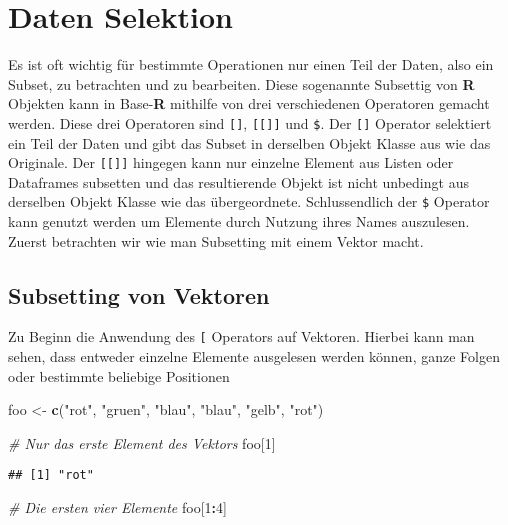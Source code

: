 \documentclass[
]{book}
\newenvironment{Shaded}{\begin{snugshade}}{\end{snugshade}}
\newcommand{\CommentTok}[1]{\textcolor[rgb]{0.56,0.35,0.01}{\textit{#1}}}
\newcommand{\DecValTok}[1]{\textcolor[rgb]{0.00,0.00,0.81}{#1}}
\newcommand{\KeywordTok}[1]{\textcolor[rgb]{0.13,0.29,0.53}{\textbf{#1}}}
\newcommand{\NormalTok}[1]{#1}
\newcommand{\OperatorTok}[1]{\textcolor[rgb]{0.81,0.36,0.00}{\textbf{#1}}}
\newcommand{\StringTok}[1]{\textcolor[rgb]{0.31,0.60,0.02}{#1}}
\begin{document}
\hypertarget{daten-selektion}{%
\section{Daten Selektion}\label{daten-selektion}}

Es ist oft wichtig für bestimmte Operationen nur einen Teil der Daten, also ein Subset, zu betrachten und zu bearbeiten.
Diese sogenannte Subsettig von \textbf{R} Objekten kann in Base-\textbf{R} mithilfe von drei verschiedenen Operatoren gemacht werden.
Diese drei Operatoren sind \texttt{{[}{]}}, \texttt{{[}{[}{]}{]}} und \texttt{\$}.
Der \texttt{{[}{]}} Operator selektiert ein Teil der Daten und gibt das Subset in derselben Objekt Klasse aus wie das Originale.
Der \texttt{{[}{[}{]}{]}} hingegen kann nur einzelne Element aus Listen oder Dataframes subsetten und das resultierende Objekt ist nicht unbedingt aus derselben Objekt Klasse wie das übergeordnete.
Schlussendlich der \texttt{\$} Operator kann genutzt werden um Elemente durch Nutzung ihres Names auszulesen.
Zuerst betrachten wir wie man Subsetting mit einem Vektor macht.

\hypertarget{subsetting-von-vektoren}{%
\subsection{Subsetting von Vektoren}\label{subsetting-von-vektoren}}

Zu Beginn die Anwendung des \texttt{{[}} Operators auf Vektoren.
Hierbei kann man sehen, dass entweder einzelne Elemente ausgelesen werden können, ganze Folgen oder bestimmte beliebige Positionen

\begin{Shaded}
\begin{Highlighting}[]
\NormalTok{foo <-}\StringTok{ }\KeywordTok{c}\NormalTok{(}\StringTok{"rot"}\NormalTok{, }\StringTok{"gruen"}\NormalTok{, }\StringTok{"blau"}\NormalTok{, }\StringTok{"blau"}\NormalTok{, }\StringTok{"gelb"}\NormalTok{, }\StringTok{"rot"}\NormalTok{)}

\CommentTok{# Nur das erste Element des Vektors}
\NormalTok{foo[}\DecValTok{1}\NormalTok{]}
\end{Highlighting}
\end{Shaded}

\begin{verbatim}
## [1] "rot"
\end{verbatim}

\begin{Shaded}
\begin{Highlighting}[]
\CommentTok{# Die ersten vier Elemente}
\NormalTok{foo[}\DecValTok{1}\OperatorTok{:}\DecValTok{4}\NormalTok{]}
\end{Highlighting}
\end{Shaded}
\end{document}
